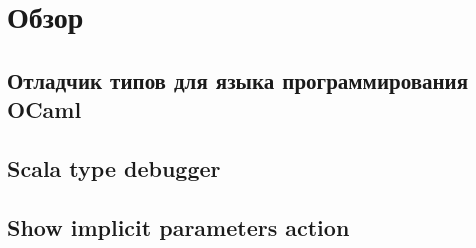 \section{Обзор}

\subsection{Отладчик типов для языка программирования OCaml}
\label{sec:ocaml}
\subsection{Scala type debugger}
\label{sec:typeDebugger}
\subsection{Show implicit parameters action}
\label{sec:showImplicit}
